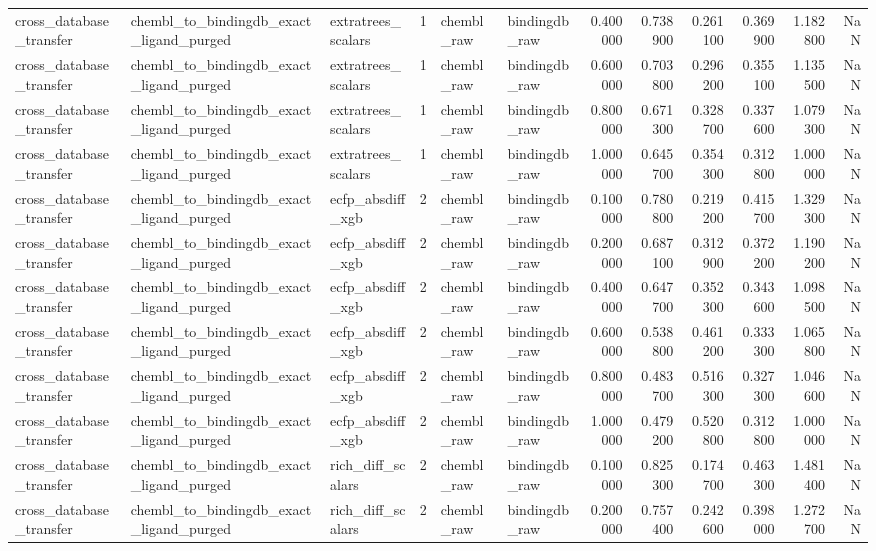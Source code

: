 \begin{longtable}{lllrllrrrrrr}
cross\_database\_transfer & chembl\_to\_bindingdb\_exact\_ligand\_purged & extratrees\_scalars & 1 & chembl\_raw & bindingdb\_raw & 0.400000 & 0.738900 & 0.261100 & 0.369900 & 1.182800 & NaN \\
cross\_database\_transfer & chembl\_to\_bindingdb\_exact\_ligand\_purged & extratrees\_scalars & 1 & chembl\_raw & bindingdb\_raw & 0.600000 & 0.703800 & 0.296200 & 0.355100 & 1.135500 & NaN \\
cross\_database\_transfer & chembl\_to\_bindingdb\_exact\_ligand\_purged & extratrees\_scalars & 1 & chembl\_raw & bindingdb\_raw & 0.800000 & 0.671300 & 0.328700 & 0.337600 & 1.079300 & NaN \\
cross\_database\_transfer & chembl\_to\_bindingdb\_exact\_ligand\_purged & extratrees\_scalars & 1 & chembl\_raw & bindingdb\_raw & 1.000000 & 0.645700 & 0.354300 & 0.312800 & 1.000000 & NaN \\
cross\_database\_transfer & chembl\_to\_bindingdb\_exact\_ligand\_purged & ecfp\_absdiff\_xgb & 2 & chembl\_raw & bindingdb\_raw & 0.100000 & 0.780800 & 0.219200 & 0.415700 & 1.329300 & NaN \\
cross\_database\_transfer & chembl\_to\_bindingdb\_exact\_ligand\_purged & ecfp\_absdiff\_xgb & 2 & chembl\_raw & bindingdb\_raw & 0.200000 & 0.687100 & 0.312900 & 0.372200 & 1.190200 & NaN \\
cross\_database\_transfer & chembl\_to\_bindingdb\_exact\_ligand\_purged & ecfp\_absdiff\_xgb & 2 & chembl\_raw & bindingdb\_raw & 0.400000 & 0.647700 & 0.352300 & 0.343600 & 1.098500 & NaN \\
cross\_database\_transfer & chembl\_to\_bindingdb\_exact\_ligand\_purged & ecfp\_absdiff\_xgb & 2 & chembl\_raw & bindingdb\_raw & 0.600000 & 0.538800 & 0.461200 & 0.333300 & 1.065800 & NaN \\
cross\_database\_transfer & chembl\_to\_bindingdb\_exact\_ligand\_purged & ecfp\_absdiff\_xgb & 2 & chembl\_raw & bindingdb\_raw & 0.800000 & 0.483700 & 0.516300 & 0.327300 & 1.046600 & NaN \\
cross\_database\_transfer & chembl\_to\_bindingdb\_exact\_ligand\_purged & ecfp\_absdiff\_xgb & 2 & chembl\_raw & bindingdb\_raw & 1.000000 & 0.479200 & 0.520800 & 0.312800 & 1.000000 & NaN \\
cross\_database\_transfer & chembl\_to\_bindingdb\_exact\_ligand\_purged & rich\_diff\_scalars & 2 & chembl\_raw & bindingdb\_raw & 0.100000 & 0.825300 & 0.174700 & 0.463300 & 1.481400 & NaN \\
cross\_database\_transfer & chembl\_to\_bindingdb\_exact\_ligand\_purged & rich\_diff\_scalars & 2 & chembl\_raw & bindingdb\_raw & 0.200000 & 0.757400 & 0.242600 & 0.398000 & 1.272700 & NaN \\

\end{longtable}
